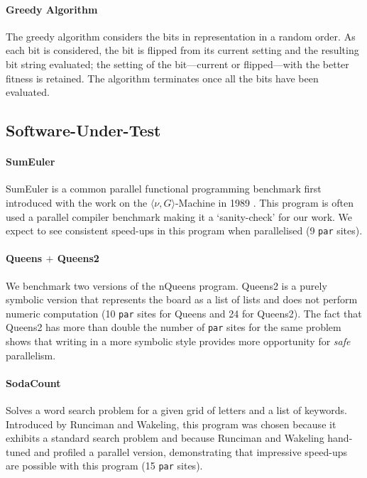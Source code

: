 \paragraph{Greedy Algorithm} The greedy algorithm considers the bits in representation in a random order.  As each bit is considered, the bit is flipped from its current setting and the resulting bit string evaluated; the setting of the bit---current or flipped---with the better fitness is retained.  The algorithm terminates once all the bits have been evaluated.

\subsection{Software-Under-Test}

\paragraph{SumEuler}
SumEuler is a common parallel functional programming benchmark first introduced
with the work on the $\langle\nu, G\rangle$-Machine in 1989 \citep{vGMachine}.
This program is often used a parallel compiler benchmark making it a `sanity-check'
for our work. We expect to see consistent speed-ups in this program when parallelised (9 \verb-par- sites).

\paragraph{Queens $+$ Queens2}
We benchmark two versions of the nQueens program. Queens2 is a purely symbolic
version that represents the board as a list of lists and does not perform
numeric computation (10 \verb-par- sites for Queens and 24 for Queens2). The fact
that Queens2 has more than double the number of \verb-par- sites for the same
problem shows that writing in a more symbolic style provides more opportunity
for \emph{safe} parallelism.

\paragraph{SodaCount}
Solves a word search problem for a given grid of letters
and a list of keywords.  Introduced by Runciman and Wakeling, this program was
chosen because it exhibits a standard search problem and because Runciman and
Wakeling hand-tuned and profiled a parallel version, demonstrating
that impressive speed-ups are possible with this program
\citep{Runciman:1996:AFP:242105} (15 \verb-par- sites).

